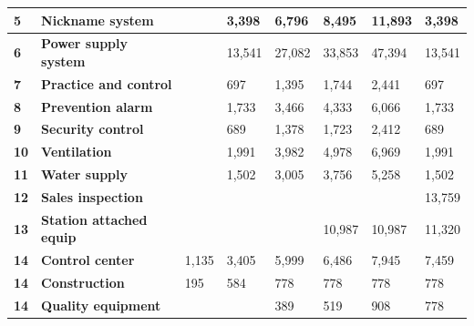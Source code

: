 \documentclass[12pt]{article}
\begin{document}
\begin{table}[htbp]
\begin{tabular}{l|l|l|l|l|l|l|l}
    \hline
    \rowcolor[rgb]{ .973,  .796,  .678} \textbf{5} & \textbf{Nickname system} &       &        3,398  &                 6,796  &        8,495  &      11,893  &        3,398  \\
    \hline
    \rowcolor[rgb]{ .988,  .894,  .839} \textbf{6} & \textbf{Power supply system} &       &      13,541  &               27,082  &      33,853  &      47,394  &      13,541  \\
    \hline
    \rowcolor[rgb]{ .973,  .796,  .678} \textbf{7} & \textbf{Practice and control} &       &           697  &                 1,395  &        1,744  &        2,441  &           697  \\
    \hline
    \rowcolor[rgb]{ .988,  .894,  .839} \textbf{8} & \textbf{Prevention alarm} &       &        1,733  &                 3,466  &        4,333  &        6,066  &        1,733  \\
    \hline
    \rowcolor[rgb]{ .973,  .796,  .678} \textbf{9} & \textbf{Security control} &       &           689  &                 1,378  &        1,723  &        2,412  &           689  \\
    \hline
    \rowcolor[rgb]{ .988,  .894,  .839} \textbf{10} & \textbf{Ventilation} &       &        1,991  &                 3,982  &        4,978  &        6,969  &        1,991  \\
    \hline
    \rowcolor[rgb]{ .973,  .796,  .678} \textbf{11} & \textbf{Water supply} &       &        1,502  &                 3,005  &        3,756  &        5,258  &        1,502  \\
    \hline
    \rowcolor[rgb]{ .988,  .894,  .839} \textbf{12} & \textbf{Sales inspection} &       &       &       &       &       &      13,759  \\
    \hline
    \rowcolor[rgb]{ .973,  .796,  .678} \textbf{13} & \textbf{Station attached equip} &       &       &       &      10,987  &      10,987  &      11,320  \\
    \hline
    \rowcolor[rgb]{ .988,  .894,  .839} \textbf{14} & \textbf{Control center} &        1,135  &        3,405  &                 5,999  &        6,486  &        7,945  &        7,459  \\
    \hline
    \rowcolor[rgb]{ .973,  .796,  .678} \textbf{14} & \textbf{Construction } &           195  &           584  &                    778  &           778  &           778  &           778  \\
    \hline
    \rowcolor[rgb]{ .988,  .894,  .839} \textbf{14} & \textbf{Quality equipment} &       &       &                    389  &           519  &           908  &           778  \\

\end{tabular}
\end{table}
\end{document}

